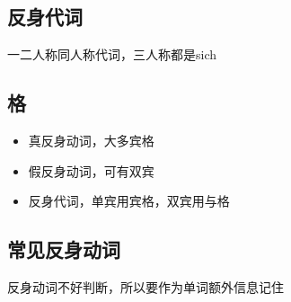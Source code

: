 \subsection{反身代词}
一二人称同人称代词，三人称都是sich

\subsection{格}
\begin{itemize}
    \item 真反身动词，大多宾格
    \item 假反身动词，可有双宾
    \item 反身代词，单宾用宾格，双宾用与格
\end{itemize}

\subsection{常见反身动词}
反身动词不好判断，所以要作为单词额外信息记住

